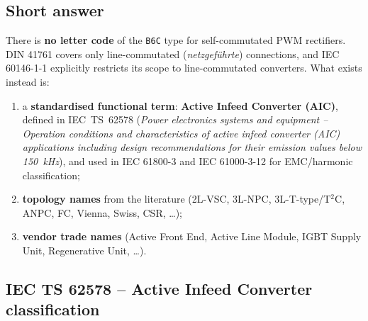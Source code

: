 \documentclass[11pt,a4paper]{article}
\newcommand{\code}[1]{\texttt{#1}}
\begin{document}
\subsection{Short answer}

There is \textbf{no letter code} of the \code{B6C} type for self-commutated PWM rectifiers. DIN 41761 covers only line-commutated (\emph{netzgeführte}) connections, and IEC 60146-1-1 explicitly restricts its scope to line-commutated converters. What exists instead is:

\begin{enumerate}
\item a \textbf{standardised functional term}: \textbf{Active Infeed Converter (AIC)}, defined in IEC~TS~62578 (\emph{Power electronics systems and equipment -- Operation conditions and characteristics of active infeed converter (AIC) applications including design recommendations for their emission values below 150~kHz}), and used in IEC 61800-3 and IEC 61000-3-12 for EMC/harmonic classification;
\item \textbf{topology names} from the literature (2L-VSC, 3L-NPC, 3L-T-type/T$^2$C, ANPC, FC, Vienna, Swiss, CSR, \ldots);
\item \textbf{vendor trade names} (Active Front End, Active Line Module, IGBT Supply Unit, Regenerative Unit, \ldots).
\end{enumerate}

\subsection{IEC TS 62578 -- Active Infeed Converter classification}
\end{document}
